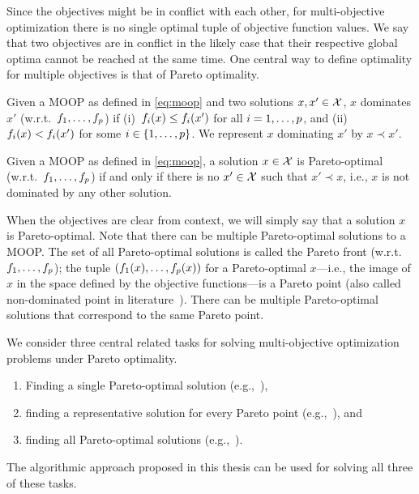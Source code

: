 Since the objectives might be in conflict with each other, for multi-objective optimization there is no single optimal tuple of objective function values.
We say that two objectives are in conflict in the likely case that their respective global optima cannot be reached at the same time.
One central way to define optimality for multiple objectives is that of Pareto optimality.
\begin{definition}
  Given a MOOP as defined in \cref{eq:moop} and two solutions $x,x' \in \mathcal{X}$, $x$ dominates $x'$ (w.r.t.\ $f_1,\dots,f_p$) if (i)~$f_i(x) \leq f_i(x')$ for all $i=1,\dots,p$, and (ii)~$f_i(x) < f_i(x')$ for some $i\in\{1,\dots,p\}$.
  We represent $x$ dominating $x'$ by $x \prec x'$.
\end{definition}
\begin{definition}
  Given a MOOP as defined in \cref{eq:moop}, a solution $x \in \mathcal{X}$ is Pareto-optimal (w.r.t.\ $f_1,\dots,f_p$) if and only if there is no $x' \in \mathcal{X}$ such that $x' \prec x$, i.e., $x$ is not dominated by any other solution.
\end{definition}
When the objectives are clear from context, we will simply say that a solution $x$ is Pareto-optimal.
Note that there can be multiple Pareto-optimal solutions to a MOOP.
The set of all Pareto-optimal solutions is called the Pareto front (w.r.t.\ $f_1,\dots,f_p$);
the tuple $(f_1(x),\dots,f_p(x))$ for a Pareto-optimal $x$---i.e., the image of $x$ in the space defined by the objective functions---is a Pareto point (also called non-dominated point in literature~\autocite{Ehrgott2005-2}).
There can be multiple Pareto-optimal solutions that correspond to the same Pareto point.

We consider three central related tasks for solving multi-objective optimization problems under Pareto optimality.
\begin{enumerate}[label=(\roman*)]
  \item Finding a single Pareto-optimal solution (e.g.,~\autocite{Ehrgott2005-3}),
  \item finding a representative solution for every Pareto point (e.g.,~\autocite{DBLP:conf/cp/SohBTB17,DBLP:conf/cp/JanotaMSM21}), and
  \item finding all Pareto-optimal solutions (e.g.,~\autocite{Isermann1979enumerationallefficient}).
\end{enumerate}
The algorithmic approach proposed in this thesis can be used for solving all three of these tasks.

